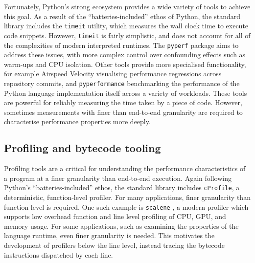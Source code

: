 Fortunately, Python's strong ecosystem provides a wide variety of tools to achieve this goal.
As a result of the ``batteries-included'' ethos of Python, the standard library includes the \texttt{timeit} utility, which measures the wall clock time to execute code snippets. However, \texttt{timeit} is fairly simplistic, and does not account for all of the complexities of modern interpreted runtimes. The \texttt{pyperf} \cite{victorstinnerPsfPyperf2025} package aims to address these issues, with more complex control over confounding effects such as warm-ups and CPU isolation.
Other tools provide more specialised functionality, for example Airspeed Velocity \cite{michaeldroettboomAirspeedvelocityAsv2025} visualising performance regressions across repository commits, and \texttt{pyperformance} \cite{collinwinterPythonPyperformance2025} benchmarking the performance of the Python language implementation itself across a variety of workloads.
These tools are powerful for reliably measuring the time taken by a piece of code. However, sometimes measurements with finer than end-to-end granularity are required to characterise performance properties more deeply.

\subsection{Profiling and bytecode tooling}
\label{ssec:profiling-bytecode-tooling}

Profiling tools are a critical for understanding the performance characteristics of a program at a finer granularity than end-to-end execution.
Again following Python's ``batteries-included'' ethos, the standard library includes \texttt{cProfile}, a deterministic, function-level profiler.
For many applications, finer granularity than function-level is required.
One such example is \texttt{scalene} \cite{bergerTriangulatingPythonPerformance2023a}, a modern profiler which supports low overhead function and line level profiling of CPU, GPU, and memory usage.
For some applications, such as examining the properties of the language runtime, even finer granularity is needed. This motivates the development of profilers below the line level, instead tracing the bytecode instructions dispatched by each line.

